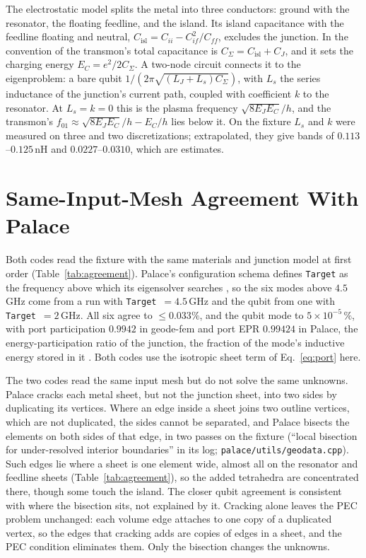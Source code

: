 \documentclass{anvil-paper}
\newcommand{\Cisl}{C_{\mathrm{isl}}}
\begin{document}
The electrostatic model splits the metal into three conductors: ground
with the resonator, the floating feedline, and the island. Its island
capacitance with the feedline floating and neutral,
$\Cisl = C_{ii} - C_{if}^2/C_{ff}$, excludes the junction. In the
convention of \citet{koch2007charge} the transmon's total capacitance is
$C_\Sigma = \Cisl + C_J$, and it sets the charging energy $E_C =
e^2/2C_\Sigma$. A two-node circuit connects it to the eigenproblem: a bare
qubit $1/(2\pi\sqrt{(L_J + L_s)C_\Sigma})$, with $L_s$ the series
inductance of the junction's current path, coupled with coefficient $k$
to the resonator. At $L_s = k = 0$ this is the plasma frequency
$\sqrt{8E_JE_C}/h$, and the transmon's $f_{01} \approx \sqrt{8E_JE_C}/h -
E_C/h$ lies below it. On the fixture $L_s$ and $k$ were measured on three and
two discretizations; extrapolated, they give bands of $0.113$--$0.125$\,nH
and $0.0227$--$0.0310$, which are estimates.

\section{Same-Input-Mesh Agreement With Palace}
\label{sec:agreement}

Both codes read the fixture with the same materials and junction model at
first order (Table~\ref{tab:agreement}). Palace's configuration schema
defines \texttt{Target} as the frequency above which its eigensolver
searches \citep{palace}, so the six modes above $4.5$\,GHz come from a run
with \texttt{Target}~$=4.5$\,GHz and the qubit from one with
\texttt{Target}~$=2$\,GHz. All six agree to $\leq 0.033\%$, and the qubit mode to $5\times10^{-5}\,\%$, with port
participation $0.9942$ in geode-fem and port EPR $0.99424$ in Palace, the
energy-participation ratio of the junction, the fraction of the mode's
inductive energy stored in it \citep{minev2021energy}. Both codes use the
isotropic sheet term of Eq.~\eqref{eq:port} here.

The two codes read the same input mesh but do not solve the same unknowns.
Palace cracks each metal sheet, but not the junction sheet, into two sides
by duplicating its vertices. Where an edge inside a sheet joins two outline
vertices, which are not duplicated, the sides cannot be separated, and
Palace bisects the elements on both sides of that edge, in two passes on
the fixture (``local bisection
for under-resolved interior boundaries'' in its log;
\texttt{palace/utils/geodata.cpp}). Such edges lie where a sheet is one
element wide, almost all on the resonator and feedline sheets
(Table~\ref{tab:agreement}), so the added tetrahedra are concentrated
there, though some touch the island.
The closer qubit agreement is consistent with where the bisection sits,
not explained by it. Cracking alone leaves the PEC problem unchanged: each
volume edge attaches to one copy of a duplicated vertex, so the edges that
cracking adds are copies of edges in a sheet, and the PEC condition
eliminates them. Only the bisection changes the unknowns.
\end{document}
